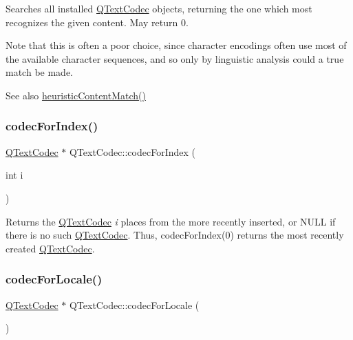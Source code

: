 Searches all installed \mbox{\hyperlink{class_q_text_codec}{Q\+Text\+Codec}} objects, returning the one which most recognizes the given content. May return 0.

Note that this is often a poor choice, since character encodings often use most of the available character sequences, and so only by linguistic analysis could a true match be made.

\begin{DoxySeeAlso}{See also}
\mbox{\hyperlink{class_q_text_codec_a4780a608d950994a927de727bb07b9fe}{heuristic\+Content\+Match()}} 
\end{DoxySeeAlso}
\mbox{\label{class_q_text_codec_a84d9d45afc8d26c0b7d5b26f81c813bf}} 
\subsubsection{\texorpdfstring{codecForIndex()}{codecForIndex()}}
{\footnotesize\ttfamily \mbox{\hyperlink{class_q_text_codec}{Q\+Text\+Codec}} $\ast$ Q\+Text\+Codec\+::codec\+For\+Index (\begin{DoxyParamCaption}\item[{int}]{i }\end{DoxyParamCaption})\hspace{0.3cm}{\ttfamily [static]}}

Returns the \mbox{\hyperlink{class_q_text_codec}{Q\+Text\+Codec}} {\itshape i} places from the more recently inserted, or N\+U\+LL if there is no such \mbox{\hyperlink{class_q_text_codec}{Q\+Text\+Codec}}. Thus, codec\+For\+Index(0) returns the most recently created \mbox{\hyperlink{class_q_text_codec}{Q\+Text\+Codec}}. \mbox{\label{class_q_text_codec_af21be033ce39428087bb853054f15ff5}} 
\subsubsection{\texorpdfstring{codecForLocale()}{codecForLocale()}}
{\footnotesize\ttfamily \mbox{\hyperlink{class_q_text_codec}{Q\+Text\+Codec}} $\ast$ Q\+Text\+Codec\+::codec\+For\+Locale (\begin{DoxyParamCaption}{ }\end{DoxyParamCaption})\hspace{0.3cm}{\ttfamily [static]}}

